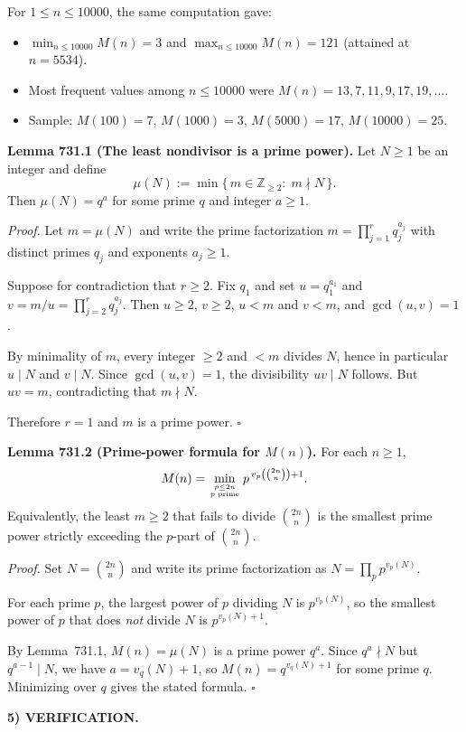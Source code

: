 For $1\le n\le 10000$, the same computation gave:
\begin{itemize}
\item $\min_{n\le 10000} M(n)=3$ and $\max_{n\le 10000} M(n)=121$ (attained at $n=5534$).
\item Most frequent values among $n\le 10000$ were $M(n)=13,7,11,9,17,19,\dots$.
\item Sample: $M(100)=7$, $M(1000)=3$, $M(5000)=17$, $M(10000)=25$.
\end{itemize}

\medskip
\noindent\textbf{Lemma 731.1 (The least nondivisor is a prime power).}
Let $N\ge 1$ be an integer and define
\[
\mu(N):=\min\{\,m\in\mathbb Z_{\ge 2}:\; m\nmid N\,\}.
\]
Then $\mu(N)=q^a$ for some prime $q$ and integer $a\ge 1$.

\noindent\emph{Proof.}
Let $m=\mu(N)$ and write the prime factorization $m=\prod_{j=1}^r q_j^{a_j}$ with distinct primes $q_j$ and exponents $a_j\ge 1$.

Suppose for contradiction that $r\ge 2$. Fix $q_1$ and set $u=q_1^{a_1}$ and $v=m/u=\prod_{j=2}^r q_j^{a_j}$. Then $u\ge 2$, $v\ge 2$, $u<m$ and $v<m$, and $\gcd(u,v)=1$.

By minimality of $m$, every integer $\ge 2$ and $<m$ divides $N$, hence in particular $u\mid N$ and $v\mid N$. Since $\gcd(u,v)=1$, the divisibility $uv\mid N$ follows. But $uv=m$, contradicting that $m\nmid N$.

Therefore $r=1$ and $m$ is a prime power. \hfill $\square$

\medskip
\noindent\textbf{Lemma 731.2 (Prime-power formula for $M(n)$).}
For each $n\ge 1$,
\[
M(n)=\min_{p\le 2n\atop p\text{ prime}} p^{\,v_p\left(\binom{2n}{n}\right)+1}.
\]
Equivalently, the least $m\ge 2$ that fails to divide $\binom{2n}{n}$ is the smallest prime power strictly exceeding the $p$-part of $\binom{2n}{n}$.

\noindent\emph{Proof.}
Set $N=\binom{2n}{n}$ and write its prime factorization as $N=\prod_p p^{v_p(N)}$.

For each prime $p$, the largest power of $p$ dividing $N$ is $p^{v_p(N)}$, so the smallest power of $p$ that does \emph{not} divide $N$ is $p^{v_p(N)+1}$.

By Lemma~731.1, $M(n)=\mu(N)$ is a prime power $q^a$. Since $q^a\nmid N$ but $q^{a-1}\mid N$, we have $a=v_q(N)+1$, so $M(n)=q^{v_q(N)+1}$ for some prime $q$. Minimizing over $q$ gives the stated formula.
\hfill $\square$

\medskip
\noindent\textbf{5) VERIFICATION.}

